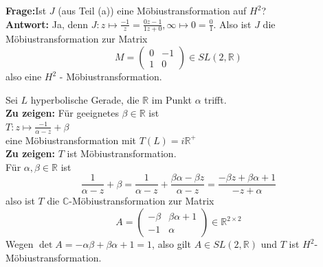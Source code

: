 \begin{problem*}[2b]
  \textbf{Frage:}Ist \( J \) (aus Teil (a)) eine Möbiustransformation auf \( H^2 \)? \\
  \textbf{Antwort:} Ja, denn \( J: z \mapsto \frac{-1}{z} = \frac{0z - 1}{1z + 0}, \infty \mapsto 0 = \frac{0}{1} \). Also ist \( J \) die Möbiustransformation zur Matrix
  \begin{equation*}
    M = \begin{pmatrix}
      0 & -1 \\
      1 & 0 
    \end{pmatrix} \in SL(2,\mathbb{R})
  \end{equation*}
  also eine \( H^2 \) - Möbiustransformation.
\end{problem*}

\begin{problem*}[3a]
  Sei \( L \) hyperbolische Gerade, die \( \mathbb{R} \) im Punkt \( \alpha \) trifft. \\
  \textbf{Zu zeigen:} Für geeignetes \( \beta \in \mathbb{R} \) ist \\
  \( T: z \mapsto \frac{-1}{\alpha - z} + \beta \) \\
  eine Möbiustransformation mit \( T(L) = i \mathbb{R}^{+} \) \\
  \textbf{Zu zeigen:} \( T \) ist Möbiustransformation. \\
  Für \( \alpha, \beta \in \mathbb{R} \) ist
  \begin{equation*}
    \frac{1}{\alpha -z} + \beta = \frac{1}{\alpha-z} + \frac{\beta \alpha - \beta z}{\alpha - z} = \frac{-\beta z + \beta \alpha + 1}{-z +\alpha}
  \end{equation*} 
  also ist \( T \) die \( \mathbb{C} \)-Möbiustransformation zur Matrix
  \begin{equation*}
    A = \begin{pmatrix}
      - \beta & \beta \alpha + 1 \\
      - 1 & \alpha 
    \end{pmatrix} \in \mathbb{R}^{2 \times 2}
  \end{equation*}
  Wegen \( \det A = - \alpha \beta + \beta \alpha + 1 = 1 \), also gilt \( A \in SL(2, \mathbb{R}) \) und \( T \) ist \( H^2 \)-Möbiustransformation.
\end{problem*}
